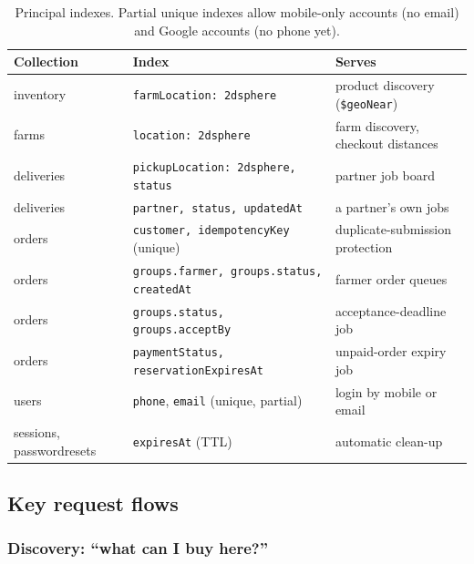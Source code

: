 \documentclass[11pt,a4paper]{article}
\begin{document}
\begin{table}[H]\centering\small
\begin{tabularx}{\linewidth}{@{}p{3cm}p{5.4cm}L@{}}
\toprule
\textbf{Collection} & \textbf{Index} & \textbf{Serves} \\
\midrule
inventory & \texttt{farmLocation: 2dsphere} & product discovery (\texttt{\$geoNear}) \\
farms & \texttt{location: 2dsphere} & farm discovery, checkout distances \\
deliveries & \texttt{pickupLocation: 2dsphere, status} & partner job board \\
deliveries & \texttt{partner, status, updatedAt} & a partner's own jobs \\
orders & \texttt{customer, idempotencyKey} (unique) & duplicate-submission protection \\
orders & \texttt{groups.farmer, groups.status, createdAt} & farmer order queues \\
orders & \texttt{groups.status, groups.acceptBy} & acceptance-deadline job \\
orders & \texttt{paymentStatus, reservationExpiresAt} & unpaid-order expiry job \\
users & \texttt{phone}, \texttt{email} (unique, partial) & login by mobile or email \\
sessions, passwordresets & \texttt{expiresAt} (TTL) & automatic clean-up \\
\bottomrule
\end{tabularx}
\caption{Principal indexes. Partial unique indexes allow mobile-only accounts (no email) and Google accounts (no phone yet).}
\end{table}

\subsection{Key request flows}

\subsubsection*{Discovery: ``what can I buy here?''}
\end{document}
